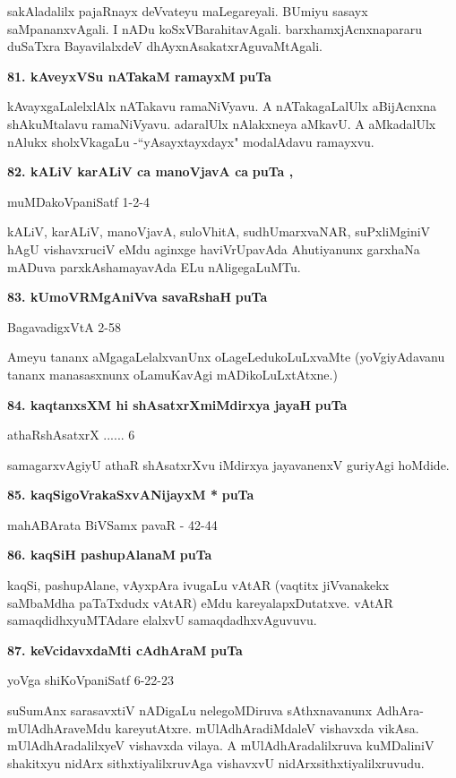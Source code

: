 \smallskip
sakAladalilx pajaRnayx deVvateyu maLegareyali. BUmiyu sasayx saMpananxvAgali. I nADu koSxVBa\-rahitavAgali. barxhamxjAcnxnapararu duSaTxra BayavilalxdeV dhAyxnAsakatxrAguvaMtAgali.

\medskip
\noindent
\textbf{81. kAveyxVSu nATakaM ramayxM} \hfill{\bf puTa \pageref{233}}

\smallskip
kAvayxgaLalelxlAlx nATakavu ramaNiVyavu. A nATakagaLalUlx aBijAcnxna shAkuMtalavu ramaNiVyavu. adaralUlx nAlakxneya aMkavU. A aMkadalUlx nAlukx sholxVkagaLu -``yAsayxtayxdayx" modalAdavu ramayxvu.

\eject
\noindent
\textbf{82. kALiV karALiV ca manoVjavA ca} \hfill{\bf puTa \pageref{116}, \pageref{210}}

\hfill{muMDakoVpaniSatf 1-2-4}

\smallskip
kALiV, karALiV, manoVjavA, suloVhitA, sudhUmarxvaNAR, suPxliMginiV hAgU vishavxruciV eMdu aginxge haviVrUpavAda Ahutiyanunx garxhaNa mADuva parxkAshamayavAda ELu nAligegaLuMTu.

\medskip
\noindent
\textbf{83. kUmoVRMgAniVva savaRshaH} \hfill{\bf puTa \pageref{73}}

\hfill{BagavadigxVtA 2-58}

\smallskip
Ameyu tananx aMgagaLelalxvanUnx oLageLedukoLuLxvaMte (yoVgiyAdavanu tananx manasasxnunx oLa\-muKavAgi mADikoLuLxtAtxne.)

\medskip
\noindent
\textbf{84. kaqtanxsXM hi shAsatxrXmiMdirxya jayaH} \hfill{\bf puTa \pageref{96}}

\hfill{athaRshAsatxrX ...... 6}

\smallskip
samagarxvAgiyU athaR shAsatxrXvu iMdirxya jayavanenxV guriyAgi hoMdide.

\medskip
\noindent
\textbf{85. kaqSigoVrakaSxvANijayxM *} \hfill{\bf puTa \pageref{91}}

\hfill{mahABArata BiVSamx pavaR - 42-44}

\medskip
\noindent
\textbf{86. kaqSiH pashupAlanaM} \hfill{\bf puTa \pageref{90}}

\smallskip
kaqSi, pashupAlane, vAyxpAra ivugaLu vAtAR (vaqtitx jiVvanakekx saMbaMdha paTaTxdudx vAtAR) eMdu kareyalapxDutatxve. vAtAR samaqdidhxyuMTAdare elalxvU samaqdadhxvAguvuvu.

\medskip
\noindent
\textbf{87. keVcidavxdaMti cAdhAraM} \hfill{\bf puTa \pageref{82}}

\hfill{yoVga shiKoVpaniSatf 6-22-23}

\smallskip
suSumAnx sarasavxtiV nADigaLu nelegoMDiruva sAthxnavanunx AdhAra-mUlA\-dhAraveMdu kareyu\-tAtxre. mUlAdhAradiMdaleV vishavxda vikAsa. mUlAdhAra\-dalilxyeV vishavxda vilaya. A mUlA\-dhAra\-dalilxruva kuMDaliniV shakitxyu nidArx sithxtiyalilxruvAga vishavxvU nidArxsithxtiyalilxruvudu.

